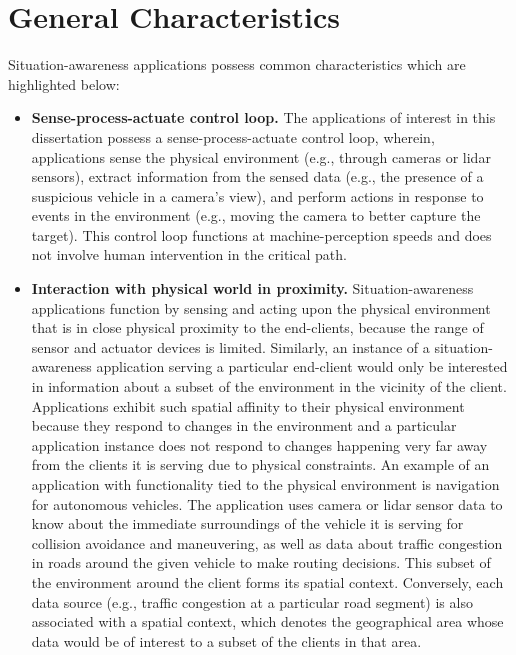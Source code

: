 \section{General Characteristics}
\label{sec:app_characteristics}
Situation-awareness applications possess common characteristics which are highlighted below:
\begin{itemize}
\item \textbf{Sense-process-actuate control loop. }  The applications of interest in this dissertation possess a sense-process-actuate control loop, wherein, applications sense the physical environment (e.g., through cameras or \gls{lidar} sensors), extract information from the sensed data (e.g., the presence of a suspicious vehicle in a camera's view), and perform actions in response to events in the environment (e.g., moving the camera to better capture the target). This control loop functions at machine-perception speeds and does not involve human intervention in the critical path.
\item \textbf{Interaction with physical world in proximity. } 
Situation-awareness applications function by sensing and acting upon the physical environment that is in close physical proximity to the end-clients, because the range of sensor and actuator devices is limited. Similarly, an instance of a situation-awareness application serving a particular end-client would only be interested in information about a subset of the environment in the vicinity of the client. Applications exhibit such spatial affinity to their physical environment because they respond to changes in the environment and a particular application instance does not respond to changes happening very far away from the clients it is serving due to physical constraints. An example of an application with functionality tied to the physical environment is navigation for autonomous vehicles. The application uses camera or \gls{lidar} sensor data to know about the immediate surroundings of the vehicle it is serving for collision avoidance and maneuvering, as well as data about traffic congestion in roads around the given vehicle to make routing decisions. This subset of the environment around the client forms its spatial context. Conversely, each data source (e.g., traffic congestion at a particular road segment) is also associated with a spatial context, which denotes the geographical area whose data would be of interest to a subset of the clients in that area.

\end{itemize}
